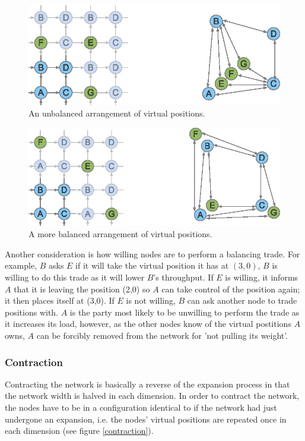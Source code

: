 \documentclass[ %
                    author={Luke Murray},
                supervisor={Dr. Simon Hollis},
                     title={Shadow Peer-to-Peer Networks},
                  subtitle={},
                    degree={MEng},
                      year={2013} ]{thesis}
\begin{document}
\begin{figure}[h]
    \centering
    \includegraphics{diagrams/network_balance1.eps}
    \caption{An unbalanced arrangement of virtual positions.}
    \label{balance1}
\end{figure}
\begin{figure}[h]
    \centering
    \includegraphics{diagrams/network_balance2.eps}
    \caption{A more balanced arrangement of virtual positions.}
    \label{balance2}
\end{figure}

Another consideration is how willing nodes are to perform a balancing trade. For example, $B$ asks $E$ if it will take the virtual position it has at $(3,0)$, $B$ is willing to do this trade as it will lower $B$'s throughput. If $E$ is willing, it informs $A$ that it is leaving the position (2,0) so $A$ can take control of the position again; it then places itself at (3,0). If $E$ is not willing, $B$ can ask another node to trade positions with. $A$ is the party most likely to be unwilling to perform the trade as it increases its load, however, as the other nodes know of the virtual postitions $A$ owns, $A$ can be forcibly removed from the network for 'not pulling its weight'.

\subsubsection{Contraction}

Contracting the network is basically a reverse of the expansion process in that the network width is halved in each dimension. In order to contract the network, the nodes have to be in a configuration identical to if the network had just undergone an expansion, i.e. the nodes' virtual positions are repeated once in each dimension (see figure \ref{contraction}).
\end{document}
